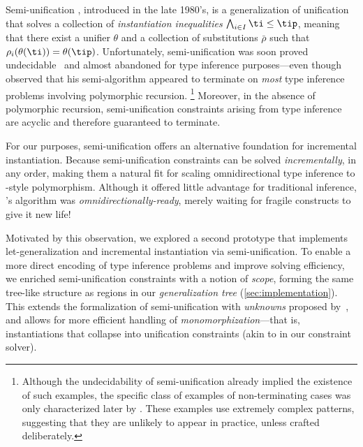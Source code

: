 \documentclass[acmsmall,screen,nonacm%
\Anonymous{,anonymous}{}%
\Final{}{,review}%
]{acmart}
\begin{document}

Semi-unification \citep*{Henglein/phd,Henglein/tiasu@toplas93}, introduced in
the late 1980's, is a generalization of unification that solves a collection
 of \emph{instantiation inequalities} $\bigwedge_{i \in I} \ti \leq \tip$,
meaning that there exist a unifier $\theta$ and a collection of
substitutions $\bar\rho$ such that $\rho_i(\theta(\ti)) = \theta(\tip)$.
%
Unfortunately, semi-unification was soon proved undecidable~\citep*{%
Kfoury-Tiuryn-Urzyczyn/ic1993} and almost abandoned for type inference
purposes---even though \citeauthor{Henglein/phd} observed that his
semi-algorithm appeared to terminate on \emph{most} \ML type inference
problems involving polymorphic recursion.%
%
\footnote{
  Although the undecidability of semi-unification already implied the existence
  of such examples, the specific class of examples of non-terminating cases was
  only characterized later by
  \citet*{Figueiredo-Camarao/semiunif-ptm@unpub2004}. 
  These examples use extremely complex patterns, suggesting that they are
  unlikely to 
  appear in practice, unless crafted deliberately.
}
%
Moreover, in the absence of polymorphic recursion, semi-unification constraints
arising from \ML type inference are acyclic and therefore guaranteed to
terminate.


For our purposes, semi-unification offers an alternative foundation for
incremental instantiation. Because semi-unification constraints can be
solved \emph{incrementally}, in any order, making them a natural fit for
scaling omnidirectional type inference to \ML-style polymorphism. Although it
offered little advantage for traditional \ML inference,
\citeauthor{Henglein/phd}'s algorithm was \emph{omnidirectionally-ready},
merely waiting for fragile constructs to give it new life!


Motivated by this observation, we explored a second prototype that implements
let-generalization and incremental instantiation via semi-unification. To
enable a more direct encoding of type inference problems and improve solving
efficiency, we enriched semi-unification constraints with a notion of
\emph{scope}, forming the same tree-like structure as regions in our
\emph{generalization tree} (\cref{sec:implementation}). This extends the
formalization of semi-unification with \emph{unknowns} proposed by~\citet
{Lushman-Cormack/subti@tr2008}, and allows for more efficient handling of
\emph{monomorphization}---that is, instantiations that collapse into
unification constraints (akin to  in our constraint solver).
\end{document}
